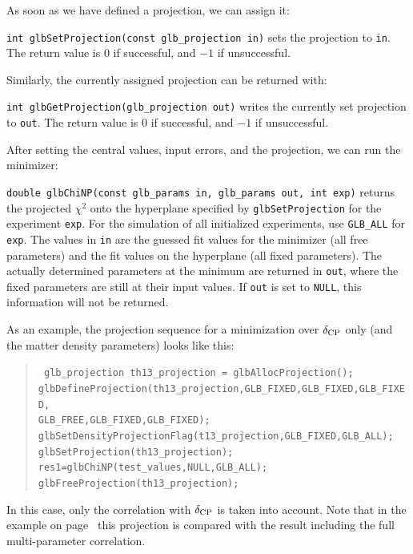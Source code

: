As soon as we have defined a projection, we can assign it:
\begin{function}
{\tt int glbSetProjection(const glb\_projection in)} sets the projection
to {\tt in}. The return value is $0$ if successful, and $-1$ if
unsuccessful.
\end{function}
Similarly, the currently assigned projection can be returned with:
\begin{function}
{\tt int glbGetProjection(glb\_projection out)} writes the currently
set projection to {\tt out}. The return value is $0$ if successful, and $-1$ if unsuccessful.
\end{function}
After setting the central values, input errors, and the projection, 
we can run the minimizer:
\begin{function}
{\tt double glbChiNP(const glb\_params in, glb\_params out, int exp)} 
returns the projected $\chi^2$ onto the hyperplane specified by 
{\tt glbSetProjection} for the  experiment {\tt exp}. 
For the simulation of all initialized experiments,
use {\tt GLB\_ALL} for {\tt exp}. The values in {\tt in} are the guessed fit values for the minimizer (all free parameters) and the fit values
on the hyperplane (all fixed parameters). The actually determined parameters at the minimum are returned in {\tt out}, where the fixed parameters are still at their input values. If {\tt out} is set to {\tt NULL}, this information will not be returned.
\end{function}
As an example, the projection sequence for a minimization over
$\delta_{\mathrm{CP}}$ only (and the matter density parameters) looks like this:
\begin{quote}
{\tt
  glb\_projection th13\_projection = glbAllocProjection(); \\
  glbDefineProjection(th13\_projection,GLB\_FIXED,GLB\_FIXED,GLB\_FIXED,\\
  \hspace*{2cm} GLB\_FREE,GLB\_FIXED,GLB\_FIXED); \\
  glbSetDensityProjectionFlag(t13\_projection,GLB\_FIXED,GLB\_ALL); \\
  glbSetProjection(th13\_projection); \\ 
  res1=glbChiNP(test\_values,NULL,GLB\_ALL); \\
  glbFreeProjection(th13\_projection);
}
\end{quote}
In this case, only the correlation with $\delta_{\mathrm{CP}}$ is taken into account.
Note that in the  example on page~\pageref{ex:corrproj} this projection
is compared with the result including the full multi-parameter correlation.


